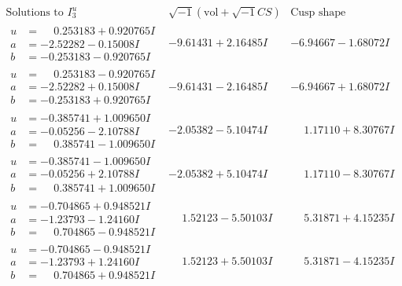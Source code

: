 \documentclass[1p]{elsarticle_modified}
\theoremstyle{definition}
\newcommand{\I}{\sqrt{-1}}
\begin{document}
$$\begin{array}{c|c|c}  
\text{Solutions to }I^u_{3}& \I (\text{vol} + \sqrt{-1}CS) & \text{Cusp shape}\\
 \hline 
\begin{aligned}
u &= \phantom{-}0.253183 + 0.920765 I \\
a &= -2.52282 - 0.15008 I \\
b &= -0.253183 - 0.920765 I\end{aligned}
 & -9.61431 + 2.16485 I & -6.94667 - 1.68072 I \\ \hline\begin{aligned}
u &= \phantom{-}0.253183 - 0.920765 I \\
a &= -2.52282 + 0.15008 I \\
b &= -0.253183 + 0.920765 I\end{aligned}
 & -9.61431 - 2.16485 I & -6.94667 + 1.68072 I \\ \hline\begin{aligned}
u &= -0.385741 + 1.009650 I \\
a &= -0.05256 - 2.10788 I \\
b &= \phantom{-}0.385741 - 1.009650 I\end{aligned}
 & -2.05382 - 5.10474 I & \phantom{-}1.17110 + 8.30767 I \\ \hline\begin{aligned}
u &= -0.385741 - 1.009650 I \\
a &= -0.05256 + 2.10788 I \\
b &= \phantom{-}0.385741 + 1.009650 I\end{aligned}
 & -2.05382 + 5.10474 I & \phantom{-}1.17110 - 8.30767 I \\ \hline\begin{aligned}
u &= -0.704865 + 0.948521 I \\
a &= -1.23793 - 1.24160 I \\
b &= \phantom{-}0.704865 - 0.948521 I\end{aligned}
 & \phantom{-}1.52123 - 5.50103 I & \phantom{-}5.31871 + 4.15235 I \\ \hline\begin{aligned}
u &= -0.704865 - 0.948521 I \\
a &= -1.23793 + 1.24160 I \\
b &= \phantom{-}0.704865 + 0.948521 I\end{aligned}
 & \phantom{-}1.52123 + 5.50103 I & \phantom{-}5.31871 - 4.15235 I \\ \hline\begin{aligned}

\end{aligned}
\end{array}$$
\end{document}
